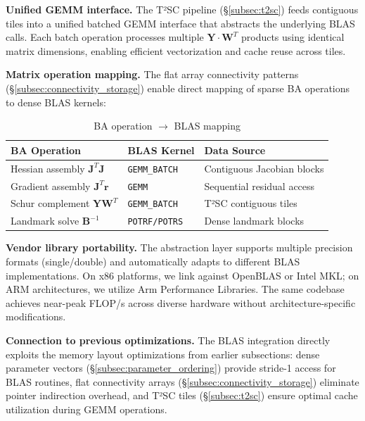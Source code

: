 \textbf{Unified GEMM interface.} The T²SC pipeline (§\ref{subsec:t2sc}) feeds contiguous tiles 
into a unified batched GEMM interface that abstracts the underlying BLAS calls. Each batch operation 
processes multiple $\mathbf{Y} \cdot \mathbf{W}^T$ products using identical matrix dimensions, 
enabling efficient vectorization and cache reuse across tiles.

\textbf{Matrix operation mapping.} The flat array connectivity patterns (§\ref{subsec:connectivity_storage}) 
enable direct mapping of sparse BA operations to dense BLAS kernels:

\begin{table}[h]
  \centering
  \caption{BA operation $\rightarrow$ BLAS mapping}
  \label{tab:blas_mapping}
  \begin{tabular}{lll}
    \toprule
    \textbf{BA Operation}         & \textbf{BLAS Kernel}    & \textbf{Data Source}                     \\
    \midrule
    Hessian assembly $\mathbf{J}^T \mathbf{J}$     & \texttt{GEMM\_BATCH}           & Contiguous Jacobian blocks               \\
    Gradient assembly $\mathbf{J}^T \mathbf{r}$    & \texttt{GEMM}           & Sequential residual access               \\
    Schur complement $\mathbf{Y} \mathbf{W}^T$     & \texttt{GEMM\_BATCH}    & T²SC contiguous tiles                   \\
    Landmark solve $\mathbf{B}^{-1}$               & \texttt{POTRF/POTRS}    & Dense landmark blocks                    \\
    \bottomrule
  \end{tabular}
\end{table}

\textbf{Vendor library portability.} The abstraction layer supports multiple precision formats 
(single/double) and automatically adapts to different BLAS implementations. On x86 platforms, 
we link against OpenBLAS or Intel MKL; on ARM architectures, we utilize Arm Performance Libraries. 
The same codebase achieves near-peak FLOP/s across diverse hardware without architecture-specific 
modifications.

\textbf{Connection to previous optimizations.} The BLAS integration directly exploits the memory 
layout optimizations from earlier subsections: dense parameter vectors (§\ref{subsec:parameter_ordering}) 
provide stride-1 access for BLAS routines, flat connectivity arrays (§\ref{subsec:connectivity_storage}) 
eliminate pointer indirection overhead, and T²SC tiles (§\ref{subsec:t2sc}) ensure optimal cache 
utilization during GEMM operations.

